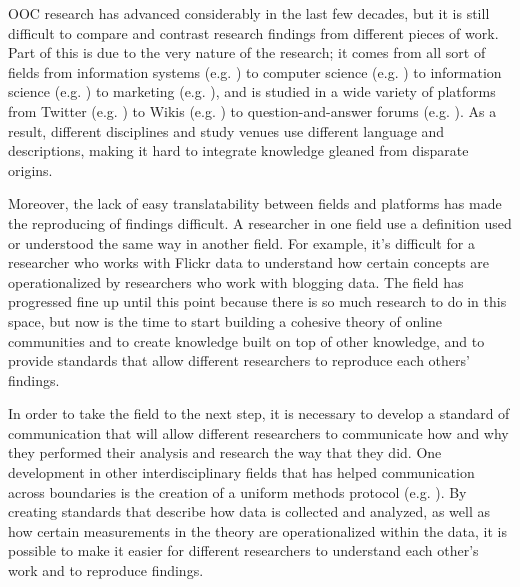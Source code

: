 OOC research has advanced considerably in the last few decades, but it is still difficult to compare and contrast research findings from different pieces of work.   Part of this is due to the very nature of the research; it comes from all sort of fields from information systems (e.g. \cite{ma07through}) to computer science (e.g. \cite{shneiderman00creating}) to information science (e.g. \cite{preece00online}) to marketing (e.g. \cite{kozinets02field}), and is studied in a wide variety of platforms from Twitter (e.g. \cite{vieweg10microblogging}) to Wikis (e.g. \cite{beschastnikh08wikipedian}) to question-and-answer forums (e.g. \cite{zhang07expertise}).  As a result, different disciplines and study venues use different language and descriptions, making it hard to integrate knowledge gleaned from disparate origins.

Moreover, the lack of easy translatability between fields and platforms has made the reproducing of findings difficult.  A researcher in one field use a definition used or understood the same way in another field.  For example, it's difficult for a researcher who works with Flickr data to understand how certain concepts are operationalized by researchers who work with blogging data. The field has progressed fine up until this point because there is so much research to do in this space, but now is the time to start building a cohesive theory of online communities and to create knowledge built on top of other knowledge, and to provide standards that allow different researchers to reproduce each others' findings.

In order to take the field to the next step, it is necessary to develop a standard of communication that will allow different researchers to communicate how and why they performed their analysis and research the way that they did.  One development in other interdisciplinary fields that has helped communication across boundaries is the creation of a uniform methods protocol (e.g. \cite{grimm10odd}).  By creating standards that describe how data is collected and analyzed, as well as how certain measurements in the theory are operationalized within the data, it is possible to make it easier for different researchers to understand each other's work and to reproduce findings.
